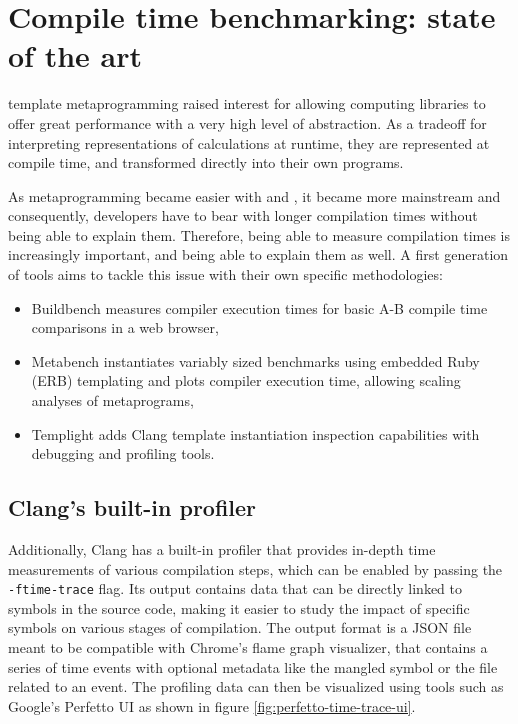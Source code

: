 \documentclass[../main]{subfiles}
\begin{document}
\section{Compile time benchmarking: state of the art}

\cpp template metaprogramming raised interest for allowing computing libraries to
offer great performance with a very high level of abstraction. As a tradeoff for
interpreting representations of calculations at runtime, they are represented at
compile time, and transformed directly into their own programs.

As metaprogramming became easier with  and , it became more mainstream
and consequently, developers have to bear with longer compilation times without
being able to explain them. Therefore, being able to measure compilation times
is increasingly important, and being able to explain them as well. A first
generation of tools aims to tackle this issue with their own specific
methodologies:

\begin{itemize}
\item Buildbench\cite{buildbench} measures compiler execution times for basic
      A-B compile time comparisons in a web browser,

\item Metabench\cite{metabench} instantiates variably sized benchmarks using
      embedded Ruby (ERB) templating and plots compiler execution time, allowing
      scaling analyses of metaprograms,

      \item Templight\cite{templight} adds Clang template instantiation inspection
      capabilities with debugging and profiling tools.
\end{itemize}

\subsection{Clang's built-in profiler}

Additionally, Clang has a built-in profiler\cite{time-trace} that provides
in-depth time measurements of various compilation steps, which can be enabled by
passing the \lstinline{-ftime-trace} flag. Its output contains data that can be
directly linked to symbols in the source code, making it easier to study the
impact of specific symbols on various stages of compilation. The output format
is a JSON file meant to be compatible with Chrome's flame graph visualizer, that
contains a series of time events with optional metadata like the mangled \cpp
symbol or the file related to an event. The profiling data can then be
visualized using tools such as Google's Perfetto UI as shown in figure
\ref{fig:perfetto-time-trace-ui}.
\end{document}
